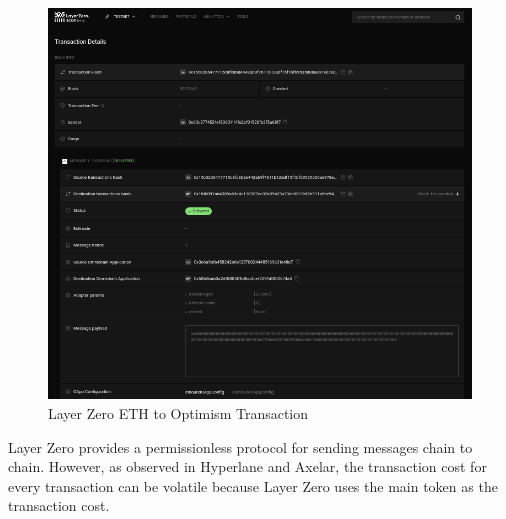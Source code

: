 \documentclass[fleqn,10pt]{olplainarticle}
\begin{document}
\begin{figure}[H]
	\centering
	\includegraphics[width=0.7\linewidth]{img/LayerZeroEthToOP}
	\caption{Layer Zero ETH to Optimism Transaction}
	\label{fig:layerzeroethtoop}
\end{figure}


Layer Zero provides a permissionless protocol for sending messages chain to chain. However, as observed in Hyperlane and Axelar, the transaction cost for every transaction can be volatile because Layer Zero uses the main token as the transaction cost.
\end{document}

